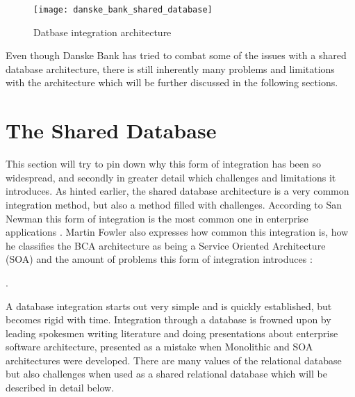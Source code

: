 {\begin{figure}[!htb]
  \texttt{[image: danske\_bank\_shared\_database]}  
  \caption{Datbase integration architecture}
  \label{fig:danske_bank_shared_database}
\end{figure}


Even though Danske Bank has tried to combat some of the issues with a shared database architecture, there is still inherently many problems and limitations with the architecture which will be further discussed in the following sections.

\section{The Shared Database}
This section will try to pin down why this form of integration has been so widespread, and secondly in greater detail which challenges and limitations it introduces. As hinted earlier, the shared database architecture is a very common integration method, but also a method filled with challenges. According to San Newman this form of integration is the most common one in enterprise applications \cite[p.~41]{newman2015microservices}. Martin Fowler also expresses how common this integration is, how he classifies the BCA architecture as being a Service Oriented Architecture (SOA) and the amount of problems this form of integration introduces \cite[t.~09:40]{fowler2014microservicesoamonolith}:

. 

A database integration starts out very simple and is quickly established, but becomes rigid with time. Integration through a database is frowned upon by leading spokesmen writing literature and doing presentations about enterprise software architecture, presented as a mistake when Monolithic and SOA architectures were developed. There are many values of the relational database but also challenges when used as a shared relational database which will be described in detail below.

}
